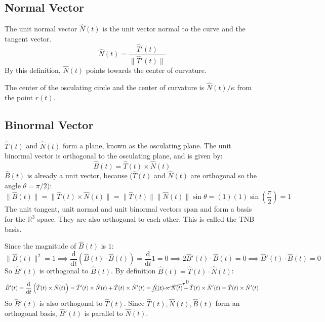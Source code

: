 \documentclass{article}
\newcommand*{\deriv}[1][x]{\ensuremath{\dfrac{\mathrm{d}}{\mathrm{d}#1}}}
\begin{document}
\subsection{Normal Vector}

The unit normal vector $\hat N(t)$ is the unit vector normal to the curve and the tangent vector.
\begin{equation*}
	\hat N(t)=\frac{\hat T'(t) }{\lVert \hat T'(t) \rVert }
\end{equation*}
By this definition, $\hat N(t)$ points towards the center of curvature.

The center of the osculating circle and the center of curvature is $\hat N(t)/\kappa$ from the point $r(t)$.

\subsection{Binormal Vector}

$\hat T(t)$ and $\hat N(t)$ form a plane, known as the osculating plane. The unit binormal vector is orthogonal to the osculating plane, and is given by:
\begin{equation*}
    \hat B(t)=\hat T(t)\times \hat N(t)
\end{equation*}
$\hat B(t)$ is already a unit vector, because ($\hat T(t)$ and $\hat N(t)$ are orthogonal so the angle $\theta=\pi/2$):
\begin{equation*}
    \lVert \hat B(t) \rVert 
	=\lVert \hat T(t)\times \hat N(t) \rVert 
	=\lVert \hat T(t) \rVert \lVert \hat N(t) \rVert \sin \theta
	=(1)(1) \sin\left(\frac{\pi}{2}\right)
	=1
\end{equation*}
The unit tangent, unit normal and unit binormal vectors span and form a basis for the $\mathbb R^3$ space. They are also orthogonal to each other. This is called the TNB basis.

Since the magnitude of $\hat B(t)$ is $1$:
\begin{equation*}
    \lVert \hat B(t) \rVert^2=1
	\implies \deriv[t](\hat B(t)\cdot \hat B(t))=\deriv[t]1=0
	\implies 2\hat B'(t)\cdot \hat B(t)=0
	\implies \hat B'(t)\cdot \hat B(t)=0
\end{equation*}
So $\hat B'(t)$ is orthogonal to $\hat B(t)$. By definition $\hat B(t)=\hat T(t)\cdot \hat N(t)$:
\begin{equation*}
	\hat B'(t)
	=\deriv[t]\left(\hat T(t)\times \hat N(t)\right)
	=\hat T'(t)\times \hat N(t)+\hat T(t)\times \hat N'(t)
	=\cancelto{0}{\hat N(t)\times \hat N(t)}+\hat T(t)\times \hat N'(t)
	=\hat T(t)\times \hat N'(t)
\end{equation*}
So $\hat B'(t)$ is also orthogonal to $\hat T(t)$. Since $\hat T(t),\hat N(t),\hat B(t)$ form an orthogonal basis, $\hat B'(t)$ is parallel to $\hat N(t)$.
\end{document}
